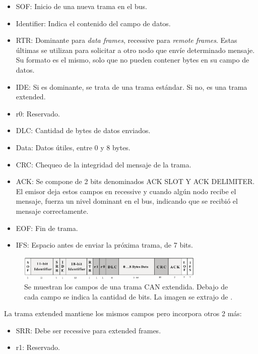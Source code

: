 \begin{itemize}
    \item SOF: Inicio de una nueva trama en el bus.
    \item Identifier: Indica el contenido del campo de datos.
    \item RTR: Dominante para \textit{data frames}, recessive para \textit{remote frames}. Estas últimas se utilizan para solicitar a otro nodo que envíe determinado mensaje. Su formato es el mismo, solo que no pueden contener bytes en su campo de datos.
    \item IDE: Si es dominante, se trata de una trama estándar. Si no, es una trama extended.
    \item r0: Reservado.
    \item DLC: Cantidad de bytes de datos enviados.
    \item Data: Datos útiles, entre 0 y 8 bytes.
    \item CRC: Chequeo de la integridad del mensaje de la trama.
    \item ACK: Se compone de 2 bits denominados ACK SLOT Y ACK DELIMITER. El emisor deja estos campos en recessive y cuando algún nodo recibe el mensaje, fuerza un nivel dominant en el bus, indicando que se recibió el mensaje correctamente.
    \item EOF: Fin de trama.
    \item IFS: Espacio antes de enviar la próxima trama, de 7 bits. 
\end{itemize}

\begin{figure}[H]
    \centering
    \includegraphics[width=0.8\textwidth]{img/CAN_frame_extended.png}
    \caption{Se muestran los campos de una trama CAN extendida. Debajo de cada campo se indica la cantidad de bits. La imagen se extrajo de \cite{texasSLOA101B}.}
    \label{fig:CAN_frame_extended}
\end{figure}

La trama extended mantiene los mismos campos pero incorpora otros 2 más:

\begin{itemize}
    \item SRR: Debe ser recessive para extended frames.
    \item r1: Reservado.
\end{itemize}


